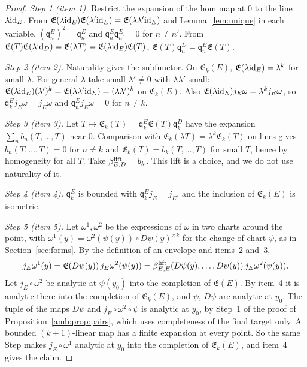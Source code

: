 \begin{proof}
\emph{Step 1 (item 1).} Restrict the expansion of the hom map at $0$ to the line $\lambda\mathrm{id}_E$. From $\mathfrak E(\lambda\mathrm{id}_E)\mathfrak E(\lambda'\mathrm{id}_E)=\mathfrak E(\lambda\lambda'\mathrm{id}_E)$ and Lemma~\ref{lem:unique} in each variable, $(\mathsf q_n^E)^2=\mathsf q_n^E$ and $\mathsf q_n^E\mathsf q_{n'}^E=0$ for $n\ne n'$. From $\mathfrak E(T)\mathfrak E(\lambda\mathrm{id}_D)=\mathfrak E(\lambda T)=\mathfrak E(\lambda\mathrm{id}_E)\mathfrak E(T)$, $\mathfrak E(T)\mathsf q_n^D=\mathsf q_n^E\mathfrak E(T)$.

\emph{Step 2 (item 2).} Naturality gives the subfunctor. On $\mathfrak E_k(E)$, $\mathfrak E(\lambda\mathrm{id}_E)=\lambda^k$ for small $\lambda$. For general $\lambda$ take small $\lambda'\ne0$ with $\lambda\lambda'$ small: $\mathfrak E(\lambda\mathrm{id}_E)(\lambda')^k=\mathfrak E(\lambda\lambda'\mathrm{id}_E)=(\lambda\lambda')^k$ on $\mathfrak E_k(E)$. Also $\mathfrak E(\lambda\mathrm{id}_E)j_E\omega=\lambda^kj_E\omega$, so $\mathsf q_k^Ej_E\omega=j_E\omega$ and $\mathsf q_n^Ej_E\omega=0$ for $n\ne k$.

\emph{Step 3 (item 3).} Let $T\mapsto\mathfrak E_k(T)=\mathsf q_k^E\mathfrak E(T)\mathsf q_k^D$ have the expansion $\sum_nb_n(T,\dots,T)$ near $0$. Comparison with $\mathfrak E_k(\lambda T)=\lambda^k\mathfrak E_k(T)$ on lines gives $b_n(T,\dots,T)=0$ for $n\ne k$ and $\mathfrak E_k(T)=b_k(T,\dots,T)$ for small $T$, hence by homogeneity for all $T$. Take $\beta^{\rm lift}_{E,D}=b_k$. This lift is a choice, and we do not use naturality of it.

\emph{Step 4 (item 4).} $\mathsf q_k^E$ is bounded with $\mathsf q_k^Ej_E=j_E$, and the inclusion of $\mathfrak E_k(E)$ is isometric.

\emph{Step 5 (item 5).} Let $\omega^1,\omega^2$ be the expressions of $\omega$ in two charts around the point, with $\omega^1(y)=\omega^2(\psi(y))\circ D\psi(y)^{\times k}$ for the change of chart $\psi$, as in Section~\ref{sec:forms}. By the definition of an envelope and items~2 and~3,
\[
 j_E\omega^1(y)=\mathfrak E(D\psi(y))\,j_E\omega^2(\psi(y))=\beta^{\rm lift}_{E,E}(D\psi(y),\dots,D\psi(y))\,j_E\omega^2(\psi(y)).
\]
Let $j_E\circ\omega^2$ be analytic at $\psi(y_0)$ into the completion of $\mathfrak E(E)$. By item~4 it is analytic there into the completion of $\mathfrak E_k(E)$, and $\psi$, $D\psi$ are analytic at $y_0$. The tuple of the maps $D\psi$ and $j_E\circ\omega^2\circ\psi$ is analytic at $y_0$, by Step~1 of the proof of Proposition~\ref{amb:prop:pairs}, which uses completeness of the final target only. A bounded $(k+1)$-linear map has a finite expansion at every point. So the same Step makes $j_E\circ\omega^1$ analytic at $y_0$ into the completion of $\mathfrak E_k(E)$, and item~4 gives the claim.
\end{proof}

